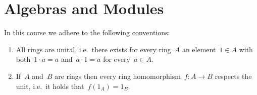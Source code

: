 \chapter{Algebras and Modules}


\begin{conventionnonum}
  In this course we adhere to the following conventions:
  \begin{enumerate}
    \item
      All rings are unital, i.e.\ there exists for every ring~$A$ an element~$1 \in A$ with both~$1 \cdot a = a$ and~$a \cdot 1 = a$ for every~$a \in A$.
    \item
      If~$A$ and~$B$ are rings then every ring homomorphism~$f \colon A \to B$ respects the unit, i.e.\ it holds that~$f(1_A) = 1_B$.
  \end{enumerate}
\end{conventionnonum}













